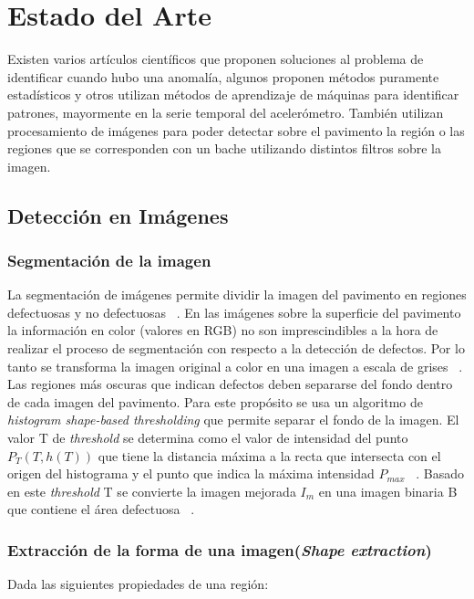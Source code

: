\chapter{Estado del Arte}\label{chapter:state-of-the-art}

Existen varios artículos científicos que proponen soluciones al problema de identificar cuando hubo una anomalía, algunos proponen métodos
puramente estadísticos y otros utilizan métodos de aprendizaje de máquinas para identificar patrones, mayormente en la serie temporal del
acelerómetro. También utilizan procesamiento de imágenes para poder detectar sobre el pavimento la región o las regiones que se corresponden
con un bache utilizando distintos filtros sobre la imagen.

\section{Detección en Imágenes}

	\subsection{Segmentación de la imagen}
	La segmentación de imágenes permite  dividir la imagen del pavimento en regiones defectuosas y no defectuosas ~.
	En las imágenes sobre la superficie del pavimento la información en color (valores en RGB) no son imprescindibles a la hora de realizar 
	el proceso de segmentación con respecto a la detección de defectos. Por lo tanto se  transforma la imagen original a color en una 
	imagen a escala de grises  ~. Las regiones más oscuras que indican defectos deben separarse del fondo 
	dentro de cada imagen del pavimento. Para este propósito se usa un algoritmo de \emph{histogram shape-based thresholding} que 
	permite separar el fondo  de la imagen. El valor T de \emph{threshold} se determina como el valor de intensidad del punto 
	$P_T(T, h(T))$ que tiene la distancia máxima a la recta que intersecta con el origen del histograma y el punto que 
	indica la máxima intensidad $P_{max}$ ~. Basado en este \emph{threshold} T se convierte la imagen 
	mejorada $I_{m}$ en una imagen binaria B que contiene el área defectuosa ~. 

	\subsection{Extracción de la forma de una imagen(\emph{Shape extraction})}
	Dada las siguientes propiedades de una región:\\

